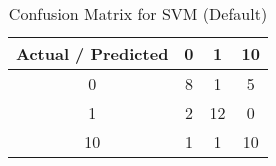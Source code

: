 \begin{table}[ht]
\centering
\caption{Confusion Matrix for SVM (Default)}
\begin{tabular}{c|ccc}
\toprule
Actual / Predicted & 0 & 1 & 10 \\
\midrule
0 & 8 & 1 & 5 \\
1 & 2 & 12 & 0 \\
10 & 1 & 1 & 10 \\
\bottomrule
\end{tabular}
\end{table}
